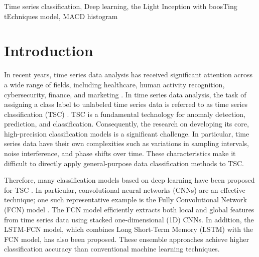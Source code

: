 \documentclass[conference]{IEEEtran}
\begin{document}
\begin{IEEEkeywords}
Time series classification, Deep learning, the Light Inception with boosTing tEchniques model, MACD histogram
\end{IEEEkeywords}

\section{Introduction}
In recent years, time series data analysis has received significant attention across a wide range of fields, including healthcare, human activity recognition, cybersecurity, finance, and marketing \cite{Bunke2004DataMI}. In time series data analysis, the task of assigning a class label to unlabeled time series data is referred to as time series classification (TSC) \cite{10.1111/rssa.12636}. TSC is a fundamental technology for anomaly detection, prediction, and classification. Consequently, the research on developing its core, high-precision classification models is a significant challenge. In particular, time series data have their own complexities such as variations in sampling intervals, noise interference, and phase shifts over time. These characteristics make it difficult to directly apply general-purpose data classification methods to TSC.

Therefore, many classification models based on deep learning have been proposed for TSC \cite{10.1145/3649448}. In particular, convolutional neural networks (CNNs) \cite{9451544} are an effective technique; one such representative example is the Fully Convolutional Network (FCN) model \cite{7966039}. The FCN model efficiently extracts both local and global features from time series data using stacked one-dimensional (1D) CNNs. In addition, the LSTM-FCN \cite{8141873} model, which combines Long Short-Term Memory (LSTM) \cite{6795963} with the FCN model, has also been proposed. These ensemble approaches achieve higher classification accuracy than conventional machine learning techniques.
\end{document}
